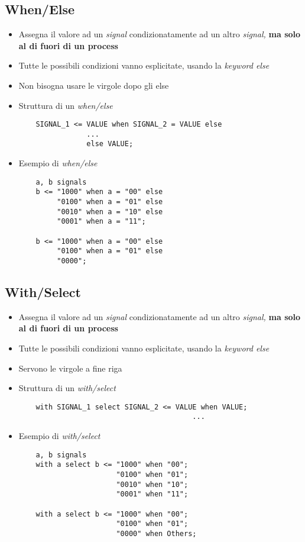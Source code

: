 \documentclass{article}
\begin{document}
\subsection{When/Else}
\begin{itemize}
	\item Assegna il valore ad un \textit{signal} condizionatamente ad un altro \textit{signal,} \textbf{ma solo al di fuori di un process}
	\item Tutte le possibili condizioni vanno esplicitate, usando la \textit{keyword else}
	\item Non bisogna usare le virgole dopo gli else
	\item Struttura di un \textit{when/else}
	      \begin{verbatim}
    SIGNAL_1 <= VALUE when SIGNAL_2 = VALUE else
                ...
                else VALUE;
	      \end{verbatim}
	      
\newpage	      
	      
	\item Esempio di \textit{when/else}
	      \begin{verbatim}
    a, b signals
    b <= "1000" when a = "00" else
         "0100" when a = "01" else
         "0010" when a = "10" else
         "0001" when a = "11";
             
    b <= "1000" when a = "00" else
         "0100" when a = "01" else
         "0000";
	      \end{verbatim}
\end{itemize}

\subsection{With/Select}
\begin{itemize}
	\item Assegna il valore ad un \textit{signal} condizionatamente ad un altro \textit{signal, } \textbf{ma solo al di fuori di un process}
	\item Tutte le possibili condizioni vanno esplicitate, usando la \textit{keyword else}
	\item Servono le virgole a fine riga
	\item Struttura di un \textit{with/select}
	\begin{verbatim}
    with SIGNAL_1 select SIGNAL_2 <= VALUE when VALUE;
                                         ...
	      \end{verbatim}
	\item Esempio di \textit{with/select}
	      \begin{verbatim}
    a, b signals
    with a select b <= "1000" when "00";
                       "0100" when "01";
                       "0010" when "10";
                       "0001" when "11";
      
    with a select b <= "1000" when "00";
                       "0100" when "01";
                       "0000" when Others;
	      \end{verbatim}
\end{itemize}
\end{document}
